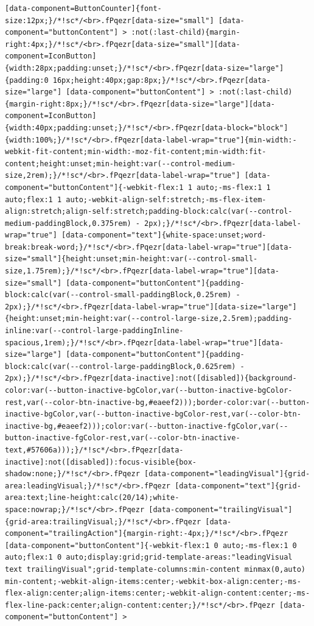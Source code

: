 \documentclass[
  letterpaper,
]{book}
\begin{document}
\begin{verbatim}
[data-component=ButtonCounter]{font-size:12px;}/*!sc*/<br>.fPqezr[data-size="small"] [data-component="buttonContent"] > :not(:last-child){margin-right:4px;}/*!sc*/<br>.fPqezr[data-size="small"][data-component=IconButton]{width:28px;padding:unset;}/*!sc*/<br>.fPqezr[data-size="large"]{padding:0 16px;height:40px;gap:8px;}/*!sc*/<br>.fPqezr[data-size="large"] [data-component="buttonContent"] > :not(:last-child){margin-right:8px;}/*!sc*/<br>.fPqezr[data-size="large"][data-component=IconButton]{width:40px;padding:unset;}/*!sc*/<br>.fPqezr[data-block="block"]{width:100%;}/*!sc*/<br>.fPqezr[data-label-wrap="true"]{min-width:-webkit-fit-content;min-width:-moz-fit-content;min-width:fit-content;height:unset;min-height:var(--control-medium-size,2rem);}/*!sc*/<br>.fPqezr[data-label-wrap="true"] [data-component="buttonContent"]{-webkit-flex:1 1 auto;-ms-flex:1 1 auto;flex:1 1 auto;-webkit-align-self:stretch;-ms-flex-item-align:stretch;align-self:stretch;padding-block:calc(var(--control-medium-paddingBlock,0.375rem) - 2px);}/*!sc*/<br>.fPqezr[data-label-wrap="true"] [data-component="text"]{white-space:unset;word-break:break-word;}/*!sc*/<br>.fPqezr[data-label-wrap="true"][data-size="small"]{height:unset;min-height:var(--control-small-size,1.75rem);}/*!sc*/<br>.fPqezr[data-label-wrap="true"][data-size="small"] [data-component="buttonContent"]{padding-block:calc(var(--control-small-paddingBlock,0.25rem) - 2px);}/*!sc*/<br>.fPqezr[data-label-wrap="true"][data-size="large"]{height:unset;min-height:var(--control-large-size,2.5rem);padding-inline:var(--control-large-paddingInline-spacious,1rem);}/*!sc*/<br>.fPqezr[data-label-wrap="true"][data-size="large"] [data-component="buttonContent"]{padding-block:calc(var(--control-large-paddingBlock,0.625rem) - 2px);}/*!sc*/<br>.fPqezr[data-inactive]:not([disabled]){background-color:var(--button-inactive-bgColor,var(--button-inactive-bgColor-rest,var(--color-btn-inactive-bg,#eaeef2)));border-color:var(--button-inactive-bgColor,var(--button-inactive-bgColor-rest,var(--color-btn-inactive-bg,#eaeef2)));color:var(--button-inactive-fgColor,var(--button-inactive-fgColor-rest,var(--color-btn-inactive-text,#57606a)));}/*!sc*/<br>.fPqezr[data-inactive]:not([disabled]):focus-visible{box-shadow:none;}/*!sc*/<br>.fPqezr [data-component="leadingVisual"]{grid-area:leadingVisual;}/*!sc*/<br>.fPqezr [data-component="text"]{grid-area:text;line-height:calc(20/14);white-space:nowrap;}/*!sc*/<br>.fPqezr [data-component="trailingVisual"]{grid-area:trailingVisual;}/*!sc*/<br>.fPqezr [data-component="trailingAction"]{margin-right:-4px;}/*!sc*/<br>.fPqezr [data-component="buttonContent"]{-webkit-flex:1 0 auto;-ms-flex:1 0 auto;flex:1 0 auto;display:grid;grid-template-areas:"leadingVisual text trailingVisual";grid-template-columns:min-content minmax(0,auto) min-content;-webkit-align-items:center;-webkit-box-align:center;-ms-flex-align:center;align-items:center;-webkit-align-content:center;-ms-flex-line-pack:center;align-content:center;}/*!sc*/<br>.fPqezr [data-component="buttonContent"] > 
\end{verbatim}
\end{document}
